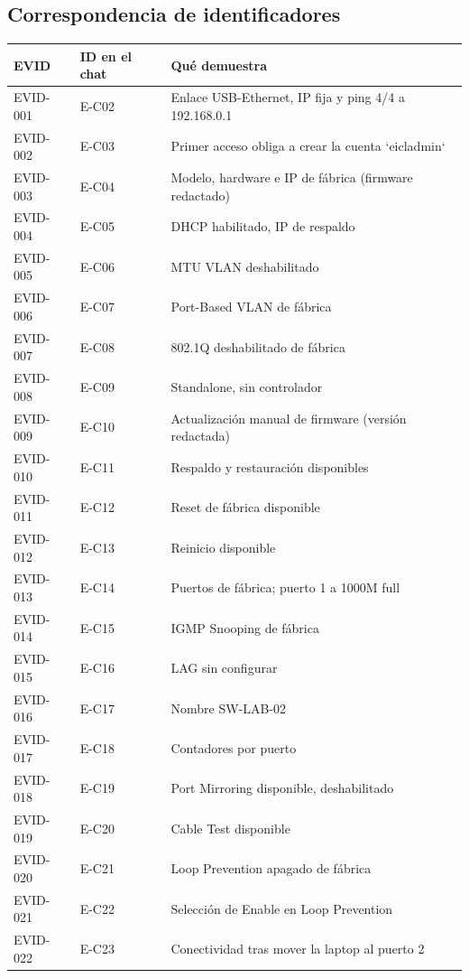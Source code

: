 \documentclass[11pt,a4paper]{article}
\newcommand{\cab}{\rowcolor{light}}
\begin{document}
\subsection*{Correspondencia de identificadores}
{\footnotesize\setlength{\tabcolsep}{4pt}
\begin{longtable}{L{1.6cm} L{1.8cm} L{11.9cm}}
  \toprule
  \cab\textbf{EVID} & \textbf{ID en el chat} & \textbf{Qué demuestra}\\
  \midrule
  \endhead
  EVID-001 & E-C02 & Enlace USB-Ethernet, IP fija y ping 4/4 a 192.168.0.1\\
  EVID-002 & E-C03 & Primer acceso obliga a crear la cuenta `eicladmin`\\
  EVID-003 & E-C04 & Modelo, hardware e IP de fábrica (firmware redactado)\\
  EVID-004 & E-C05 & DHCP habilitado, IP de respaldo\\
  EVID-005 & E-C06 & MTU VLAN deshabilitado\\
  EVID-006 & E-C07 & Port-Based VLAN de fábrica\\
  EVID-007 & E-C08 & 802.1Q deshabilitado de fábrica\\
  EVID-008 & E-C09 & Standalone, sin controlador\\
  EVID-009 & E-C10 & Actualización manual de firmware (versión redactada)\\
  EVID-010 & E-C11 & Respaldo y restauración disponibles\\
  EVID-011 & E-C12 & Reset de fábrica disponible\\
  EVID-012 & E-C13 & Reinicio disponible\\
  EVID-013 & E-C14 & Puertos de fábrica; puerto 1 a 1000M full\\
  EVID-014 & E-C15 & IGMP Snooping de fábrica\\
  EVID-015 & E-C16 & LAG sin configurar\\
  EVID-016 & E-C17 & Nombre SW-LAB-02\\
  EVID-017 & E-C18 & Contadores por puerto\\
  EVID-018 & E-C19 & Port Mirroring disponible, deshabilitado\\
  EVID-019 & E-C20 & Cable Test disponible\\
  EVID-020 & E-C21 & Loop Prevention apagado de fábrica\\
  EVID-021 & E-C22 & Selección de Enable en Loop Prevention\\
  EVID-022 & E-C23 & Conectividad tras mover la laptop al puerto 2\\

\end{longtable}}
\end{document}
